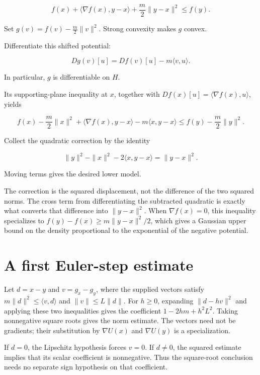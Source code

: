 \documentclass[11pt,a4paper]{article}
\begin{document}
\[f(x)+\langle\nabla f(x),y-x\rangle+\frac m2\|y-x\|^2\le f(y).\]

Set \(g(v)=f(v)-\frac m2\|v\|^2\). Strong convexity makes \(g\) convex.



Differentiate this shifted potential:

\[Dg(v)[u]=Df(v)[u]-m\langle v,u\rangle.\]

In particular, \(g\) is differentiable on \(H\).



Its supporting-plane inequality at \(x\), together with \(Df(x)[u]=\langle\nabla f(x),u\rangle\), yields

\[f(x)-\frac m2\|x\|^2+\langle\nabla f(x),y-x\rangle-m\langle x,y-x\rangle\le f(y)-\frac m2\|y\|^2.\]

Collect the quadratic correction by the identity

\[\|y\|^2-\|x\|^2-2\langle x,y-x\rangle=\|y-x\|^2.\]

Moving terms gives the desired lower model.



The correction is the squared displacement, not the difference of the two squared norms. The cross term from differentiating the subtracted quadratic is exactly what converts that difference into \(\|y-x\|^2\). When \(\nabla f(x)=0\), this inequality specializes to \(f(y)-f(x)\ge m\|y-x\|^2/2\), which gives a Gaussian upper bound on the density proportional to the exponential of the negative potential.


\section{\texorpdfstring{A first Euler-step estimate}{A first Euler-step estimate}}


Let \(d=x-y\) and \(v=g_x-g_y\), where the supplied vectors satisfy \(m\|d\|^2\le\langle v,d\rangle\) and \(\|v\|\le L\|d\|\). For \(h\ge0\), expanding \(\|d-hv\|^2\) and applying these two inequalities gives the coefficient \(1-2hm+h^2L^2\). Taking nonnegative square roots gives the norm estimate. The vectors need not be gradients; their substitution by \(\nabla U(x)\) and \(\nabla U(y)\) is a specialization.



If \(d=0\), the Lipschitz hypothesis forces \(v=0\). If \(d\ne0\), the squared estimate implies that its scalar coefficient is nonnegative. Thus the square-root conclusion needs no separate sign hypothesis on that coefficient.
\end{document}
